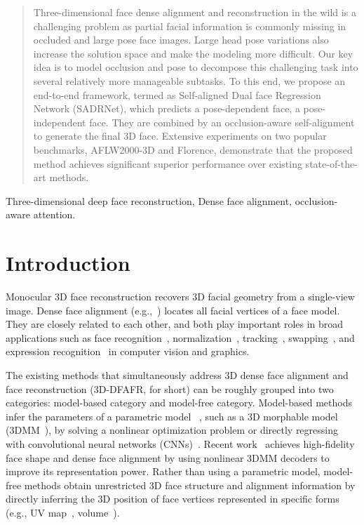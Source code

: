 \documentclass[journal]{IEEEtran}
\begin{document}
	\begin{abstract}
		Three-dimensional face dense alignment and reconstruction in the wild is a challenging problem as partial facial information is commonly missing in occluded and large pose face images. Large head pose variations also increase the solution space and make the modeling more difficult. Our key idea is to model occlusion and pose to decompose this challenging task into several relatively more manageable subtasks. To this end, we propose an end-to-end framework, termed as Self-aligned Dual face Regression Network (SADRNet), which predicts a pose-dependent face, a pose-independent face. They are combined by an occlusion-aware self-alignment to generate the final 3D face. Extensive experiments on two popular benchmarks, AFLW2000-3D and Florence, demonstrate that the proposed method achieves significant superior performance over existing state-of-the-art methods.
		
	\end{abstract}
\begin{IEEEkeywords}
		Three-dimensional deep face reconstruction, Dense face alignment, occlusion-aware attention.
	\end{IEEEkeywords}
	
	
	
	\IEEEpeerreviewmaketitle
	
	\section{Introduction}
	
	Monocular 3D face reconstruction recovers 3D facial geometry from a single-view image. Dense face alignment (e.g.,~\cite{3DDFA,PRN}) locates all facial vertices of a face model.
	They are closely related to each other, and both play important roles in broad applications such as face recognition~\cite{frjp,face_recog}, normalization~\cite{Zhu_2015_CVPR}, tracking~\cite{Xiong_2015_CVPR}, swapping~\cite{swap}, and expression recognition~\cite{express} in computer vision and graphics.
	
	The existing methods that simultaneously address 3D dense face alignment and face reconstruction (3D-DFAFR, for short) can be roughly grouped into two categories: model-based category and model-free category.
	Model-based methods infer the parameters of a parametric model
	~\cite{FLAME,Loper:2015:SSM:2816795.2818013}, such as a 3D morphable model (3DMM~\cite{Blanz:1999:MMS:311535.311556}), by solving a nonlinear optimization problem or directly regressing with convolutional neural networks (CNNs)~\cite{MMFace2019_CVPR,extreme_2018_CVPR,3DDFA,dual_attention,graphcvpr20,3ddfav2}.
	Recent work~\cite{Nonlinear_3DMM,FPS,on_learning,Tran_2019_CVPR,FPS}
	achieves high-fidelity face shape and dense face alignment by using
	nonlinear 3DMM decoders to improve its representation power.
	Rather than using a parametric model, model-free methods obtain unrestricted 3D face structure and alignment information by directly inferring the 3D position of face vertices represented in specific forms (e.g., UV map~\cite{PRN}, volume~\cite{VRN}).
	
\end{document}

